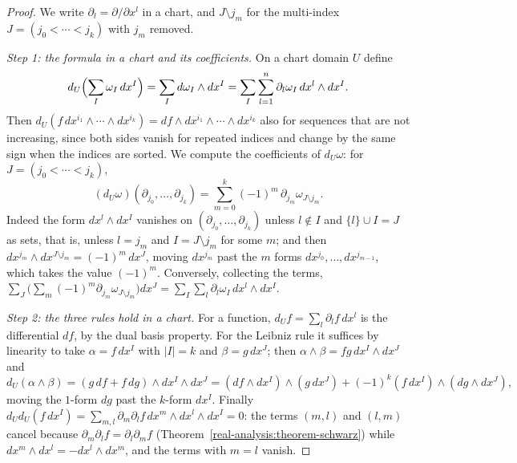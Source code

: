 \begin{proof}
We write $\partial_l = \partial/\partial x^l$ in a chart, and $J \setminus j_m$ for the multi-index $J = (j_0 < \cdots < j_k)$ with $j_m$ removed.

\emph{Step 1: the formula in a chart and its coefficients.} On a chart domain $U$ define
\[
d_U\Bigl(\sum_I\omega_I\,dx^I\Bigr) = \sum_Id\omega_I \wedge dx^I = \sum_I\sum_{l=1}^n\partial_l\omega_I\,dx^l \wedge dx^I.
\]
Then $d_U(f\,dx^{i_1} \wedge \cdots \wedge dx^{i_k}) = df \wedge dx^{i_1} \wedge \cdots \wedge dx^{i_k}$ also for sequences that are not increasing, since both sides vanish for repeated
indices and change by the same sign when the indices are sorted. We compute the coefficients of $d_U\omega$: for $J = (j_0 < \cdots < j_k)$,
\[
(d_U\omega)(\partial_{j_0}, \ldots, \partial_{j_k}) = \sum_{m=0}^k(-1)^m\,\partial_{j_m}\omega_{J \setminus j_m}.
\]
Indeed the form $dx^l \wedge dx^I$ vanishes on $(\partial_{j_0}, \ldots, \partial_{j_k})$ unless $l \notin I$ and $\{l\} \cup I = J$ as sets, that is, unless $l = j_m$ and
$I = J \setminus j_m$ for some $m$; and then $dx^{j_m} \wedge dx^{J \setminus j_m} = (-1)^m\,dx^J$, moving $dx^{j_m}$ past the $m$ forms $dx^{j_0}, \ldots, dx^{j_{m-1}}$, which takes
the value $(-1)^m$. Conversely, collecting the terms, $\sum_J\bigl(\sum_m(-1)^m\partial_{j_m}\omega_{J \setminus j_m}\bigr)dx^J = \sum_I\sum_l\partial_l\omega_I\,dx^l \wedge dx^I$.

\emph{Step 2: the three rules hold in a chart.} For a function, $d_Uf = \sum_l\partial_lf\,dx^l$ is the differential $df$, by the dual basis property. For the Leibniz rule it suffices by
linearity to take $\alpha = f\,dx^I$ with $|I| = k$ and $\beta = g\,dx^J$; then $\alpha \wedge \beta = fg\,dx^I \wedge dx^J$ and
\[
d_U(\alpha \wedge \beta) = (g\,df + f\,dg) \wedge dx^I \wedge dx^J = (df \wedge dx^I) \wedge (g\,dx^J) + (-1)^k(f\,dx^I) \wedge (dg \wedge dx^J),
\]
moving the $1$-form $dg$ past the $k$-form $dx^I$. Finally
$d_Ud_U(f\,dx^I) = \sum_{m,l}\partial_m\partial_lf\,dx^m \wedge dx^l \wedge dx^I = 0$: the terms $(m, l)$ and $(l, m)$ cancel because $\partial_m\partial_lf = \partial_l\partial_mf$
(Theorem~\ref{real-analysis:theorem-schwarz}) while $dx^m \wedge dx^l = -dx^l \wedge dx^m$, and the terms with $m = l$ vanish.


\end{proof}
